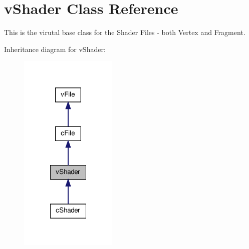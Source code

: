 \hypertarget{classv_shader}{
\section{vShader Class Reference}
\label{classv_shader}
}


This is the virutal base class for the Shader Files -\/ both Vertex and Fragment.  




Inheritance diagram for vShader:
\nopagebreak
\begin{figure}[H]
\begin{center}
\leavevmode
\includegraphics[width=132pt]{classv_shader__inherit__graph}
\end{center}
\end{figure}


